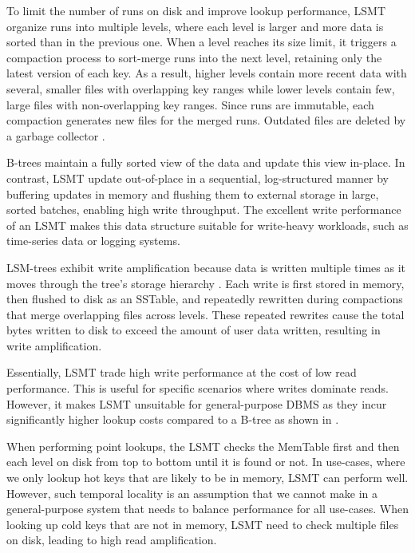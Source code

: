 To limit the number of runs on disk and improve lookup performance, \ac{LSMT} organize runs into multiple levels, where each level is larger and more data is sorted than in the previous one.
When a level reaches its size limit, it triggers a compaction process to sort-merge runs into the next level, retaining only the latest version of each key.
As a result, higher levels contain more recent data with several, smaller files with overlapping key ranges while lower levels contain few, large files with non-overlapping key ranges.
Since runs are immutable, each compaction generates new files for the merged runs.
Outdated files are deleted by a garbage collector \cite{sarkar2022lsmt}.

B-trees maintain a fully sorted view of the data and update this view in-place.
In contrast, \ac{LSMT} update out-of-place in a sequential, log-structured manner by buffering updates in memory and flushing them to external storage in large, sorted batches, enabling high write throughput.
The excellent write performance of an \ac{LSMT} makes this data structure suitable for write-heavy workloads, such as time-series data or logging systems.


LSM-trees exhibit write amplification because data is written multiple times as it moves through the tree's storage hierarchy \cite{kuszmaul2014fractal}.
Each write is first stored in memory, then flushed to disk as an SSTable, and repeatedly rewritten during compactions that merge overlapping files across levels. 
These repeated rewrites cause the total bytes written to disk to exceed the amount of user data written, resulting in write amplification.

Essentially, \ac{LSMT} trade high write performance at the cost of low read performance.
This is useful for specific scenarios where writes dominate reads.
However, it makes \ac{LSMT} unsuitable for general-purpose \ac{DBMS} as they incur significantly higher lookup costs compared to a B-tree as shown in \cite{gorrod2017wiredtiger}.

When performing point lookups, the \ac{LSMT} checks the MemTable first and then each level on disk from top to bottom until it is found or not.
In use-cases, where we only lookup hot keys that are likely to be in memory, \ac{LSMT} can perform well.
However, such temporal locality is an assumption that we cannot make in a general-purpose system that needs to balance performance for all use-cases.
When looking up cold keys that are not in memory, \ac{LSMT} need to check multiple files on disk, leading to high read amplification.

